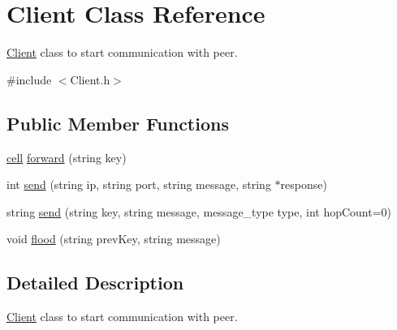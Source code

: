 \hypertarget{classClient}{\section{Client Class Reference}
\label{classClient}
}


\hyperlink{classClient}{Client} class to start communication with peer.  




{\ttfamily \#include $<$Client.\-h$>$}

\subsection*{Public Member Functions}
\begin{DoxyCompactItemize}
\item 
\hyperlink{structcell}{cell} \hyperlink{classClient_a60acaf3da29aa7fa950cfd693456ae9a}{forward} (string key)
\item 
int \hyperlink{classClient_a8a83655f0de978963e0edae6aaba25d6}{send} (string ip, string port, string message, string $\ast$response)
\item 
string \hyperlink{classClient_adba5263fc487e835c6d5881151d2fddb}{send} (string key, string message, message\-\_\-type type, int hop\-Count=0)
\item 
void \hyperlink{classClient_ad6f0c1591bafeace286fb6e5f14d430e}{flood} (string prev\-Key, string message)
\end{DoxyCompactItemize}


\subsection{Detailed Description}
\hyperlink{classClient}{Client} class to start communication with peer. 

